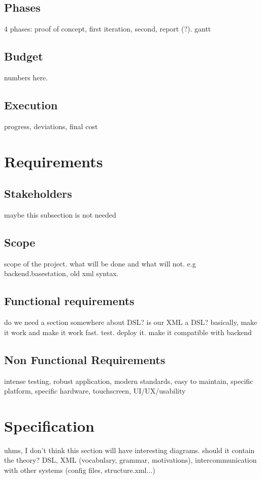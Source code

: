 \section{Phases}
4 phases: proof of concept, first iteration, second, report (?). gantt
\section{Budget}
numbers here.
\section{Execution}
progress, deviations, final cost


\chapter{Requirements}
\section{Stakeholders}
maybe this subsection is not needed
\section{Scope}
scope of the project. what will be done and what will not. e.g backend.basestation, old xml syntax.

\section{Functional requirements}
do we need a section somewhere about DSL? is our XML a DSL?
basically, make it work and make it work fast. test. deploy it. make it compatible with backend

\section{Non Functional Requirements}
intense testing, robust application, modern standards, easy to maintain, specific platform, specific hardware, touchscreen, UI/UX/usability

\chapter{Specification}
uhms, I don't think this section will have interesting diagrams.
should it contain the theory? DSL, XML (vocabulary, grammar, motivations), intercommunication with other systems (config files, structure.xml...)

